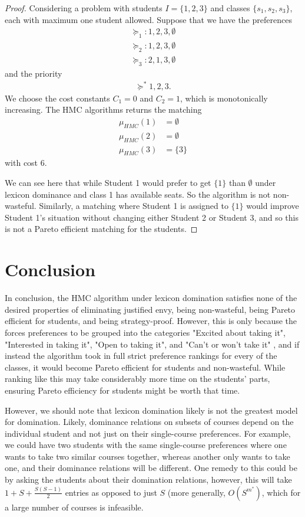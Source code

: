 \documentclass[12pt,letterpaper]{extarticle}
\begin{document}
\begin{proof}
Considering a problem with students $I = \{1,2,3\}$ and classes $\{s_1,s_2,s_3\}$, each with maximum one student allowed. Suppose that we have the preferences
\begin{align*}
    \succcurlyeq_1 : 1,2,3,\emptyset \\
    \succcurlyeq_2 : 1,2,3,\emptyset \\
    \succcurlyeq_3 : 2,1,3,\emptyset
\end{align*}
and the priority
\begin{align*}
    \succcurlyeq^* 1,2,3.
\end{align*}
We choose the cost constants $C_1 = 0$ and $C_2 = 1$, which is monotonically increasing. The HMC algorithms returns the matching
\begin{align*}
    \mu_{HMC}(1) &= \emptyset \\
    \mu_{HMC}(2) &= \emptyset \\
    \mu_{HMC}(3) &= \{3\}
\end{align*}
with cost 6.

We can see here that while Student 1 would prefer to get $\{1\}$ than $\emptyset$ under lexicon dominance and class 1 has available seats. So the algorithm is not non-wasteful. Similarly, a matching where Student 1 is assigned to $\{1\}$ would improve Student 1's situation without changing either Student 2 or Student 3, and so this is not a Pareto efficient matching for the students.
\end{proof}

\section{Conclusion}

In conclusion, the HMC algorithm under lexicon domination satisfies none of the desired properties of eliminating justified envy, being non-wasteful, being Pareto efficient for students, and being strategy-proof. However, this is only because the forces preferences to be grouped into the categories "Excited about taking it", "Interested in taking it", "Open to taking it", and "Can't or won't take it" \cite{hmc}, and if instead the algorithm took in full strict preference rankings for every of the classes, it would become Pareto efficient for students and non-wasteful. While ranking like this may take considerably more time on the students' parts, ensuring Pareto efficiency for students might be worth that time.

However, we should note that lexicon domination likely is not the greatest model for domination. Likely, dominance relations on subsets of courses depend on the individual student and not just on their single-course preferences. For example, we could have two students with the same single-course preferences where one wants to take two similar courses together, whereas another only wants to take one, and their dominance relations will be different. One remedy to this could be by asking the students about their domination relations, however, this will take $1 + S + \frac{S(S-1)}{2}$ entries as opposed to just $S$ (more generally, $O(S^{m^*})$, which for a large number of courses is infeasible.
\end{document}
